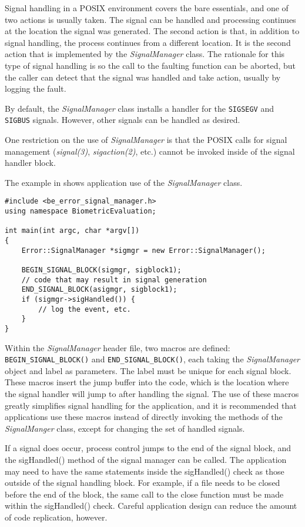 Signal handling in a POSIX environment covers the bare essentials, and one of
two actions is usually taken. The signal can be handled and processing
continues at the location the signal was generated. The second action is
that, in addition to signal handling, the process continues from a different
location. It is the second action that is implemented by the
{\em SignalManager} class. The rationale for this type of signal handling is
so the call to the faulting function can be aborted, but the caller can
detect that the signal was handled and take action, usually by logging the
fault.

By default, the {\em SignalManager} class installs a handler for the
{\tt SIGSEGV} and {\tt SIGBUS} signals. However, other signals can be
handled as desired.

One restriction on the use of {\em SignalManager} is that the POSIX calls for
signal management ({\em signal(3)}, {\em sigaction(2)}, etc.) cannot be
invoked inside of the signal handler block.

The example in  shows application use of the
{\em SignalManager} class.

\lstset{language=c++}
\begin{lstlisting}[caption={Using the SignalManger}, label=signalmanageruse]
#include <be_error_signal_manager.h>
using namespace BiometricEvaluation;

int main(int argc, char *argv[])
{
	Error::SignalManager *sigmgr = new Error::SignalManager();

	BEGIN_SIGNAL_BLOCK(sigmgr, sigblock1);
	// code that may result in signal generation
	END_SIGNAL_BLOCK(asigmgr, sigblock1);
	if (sigmgr->sigHandled()) {
		// log the event, etc.
	}
}
\end{lstlisting}

Within the {\em SignalManager} header file, two macros are defined:
{\tt BEGIN\_SIGNAL\_BLOCK()} and {\tt END\_SIGNAL\_BLOCK()}, each taking the
{\em SignalManager} object and label as parameters. The label must be unique
for each signal block. These macros insert the
jump buffer into the code, which is the location where the signal handler will
jump to after handling the signal. The use of these macros greatly simplifies
signal handling for the application, and it is recommended that applications
use these macros instead of directly invoking the methods of the
{\em SignalManger} class, except for changing the set of handled signals.

If a signal does occur, process control jumps to the end of the signal block,
and the sigHandled() method of the signal manager can be called. The
application may need to have the same statements inside the sigHandled() check
as those outside of the signal handling block. For example, if a file needs
to be closed before the end of the block, the same call to the close function
must be made within the sigHandled() check. Careful application design can
reduce the amount of code replication, however.

